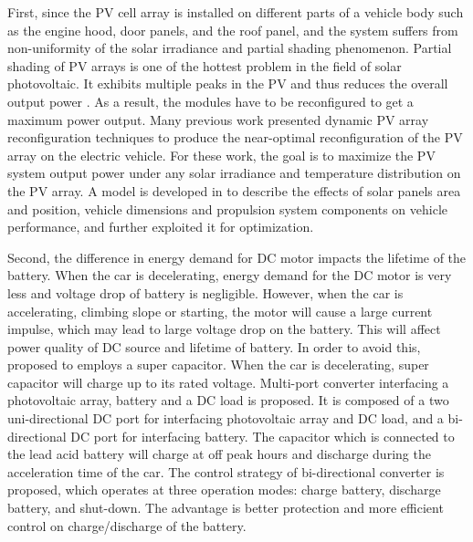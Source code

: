 First, since the PV cell array is installed on different parts of a vehicle body such as the engine hood, door panels, and the roof panel, and the system suffers from non-uniformity of the solar irradiance and partial shading phenomenon.
Partial shading of PV arrays is one of the hottest problem in the field of solar photovoltaic.
It exhibits multiple peaks in the PV and thus reduces the overall output power \cite{JX_rajan2017solar}.
As a result, the modules have to be reconfigured to get a maximum power output.
Many previous work \cite{JX_wang2012dynamic, JX_kim2014fast,JX_storey2014optimized,JX_arsie2006optimal} presented dynamic PV array reconfiguration techniques to produce the near-optimal reconfiguration of the PV array on the electric vehicle.
For these work, the goal is to maximize the PV system output power under any solar irradiance and temperature distribution on the PV array.
A model is developed in \cite{JX_vicente2015photovoltaic} to describe the effects of solar panels area and position, vehicle dimensions and propulsion system components on vehicle performance, and further exploited it for optimization.


Second, the difference in energy demand for DC motor impacts the lifetime of the battery.
When the car is decelerating, energy demand for the DC motor is very less and voltage drop of battery is negligible.
However, when the car is accelerating, climbing slope or starting, the motor will cause a large current impulse, which may lead to large voltage drop on the battery.
This will affect power quality of DC source and lifetime of battery.
In order to avoid this, \cite{JX_vincent2013advanced,JX_hopkins2015high,JX_agrawal2016multi} proposed to employs a super capacitor.
When the car is decelerating, super capacitor will charge up to its rated voltage.
Multi-port converter interfacing a photovoltaic array, battery and a DC load is proposed.
It is composed of a two uni-directional DC port for interfacing photovoltaic array and DC load, and a bi-directional DC port for interfacing battery.
The capacitor which is connected to the lead acid battery will charge at off peak hours and discharge during the acceleration time of the car.
The control strategy of bi-directional converter is proposed, which operates at three operation modes: charge battery, discharge battery, and shut-down.
The advantage is better protection and more efficient control on charge/discharge of the battery.

